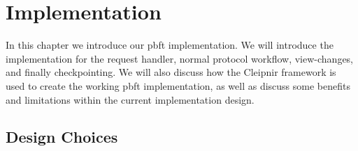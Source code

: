 \chapter{Implementation}

\label{chapter:Imp}

In this chapter we introduce our \ac{pbft} implementation. We will introduce the implementation for the request handler, normal protocol workflow, view-changes, and finally checkpointing. We will also discuss how the Cleipnir framework is used to create the working \ac{pbft} implementation, as well as discuss some benefits and limitations within the current implementation design.

\section{Design Choices}

